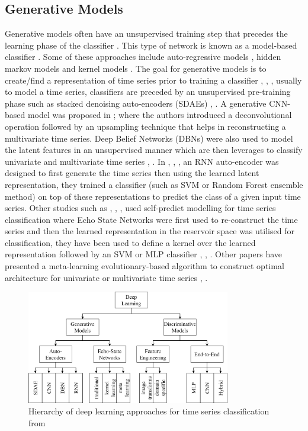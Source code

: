 \documentclass[journal]{IEEEtran}
\begin{document}
\subsection{Generative Models}
Generative models often have an unsupervised training step that precedes the learning phase of the classifier \cite{langkvist2014}. This type of network is known as a model-based classifier \cite{Bagnall2016b}. Some of these approaches include auto-regressive models \cite{bagnall2014}, hidden markov models \cite{kotsifakos2014} and kernel models \cite{chen2013}. The goal for generative models is to create/find a representation of time series prior to training a classifier \cite{IsmailFawaz2018deep}, \cite{langkvist2014}, , usually to model a time series, classifiers are preceded by an unsupervised pre-training phase such as stacked denoising auto-encoders (SDAEs) \cite{bengio2013}, \cite{hu2016}. A generative CNN-based model was proposed in \cite{wang2016}; \cite{mittelman2015} where the authors introduced a deconvolutional operation followed by an upsampling technique that helps in reconstructing a multivariate time series. Deep Belief Networks (DBNs) were also used to model the latent features in an unsupervised manner which are then leverages to classify univariate and multivariate time series \cite{wang2017a}, \cite{banerjee2017}. In \cite{mehdiyev2017}, \cite{malhotra2017}, \cite{rajan2018}, an RNN auto-encoder was designed to first generate the time series then using the learned latent representation, they trained a classifier (such as SVM or Random Forest ensemble method) on top of these representations to predict the class of a given input time series.
Other studies such as \cite{aswolinskiy2017}, \cite{bianchi2020}, \cite{chouikhi2018}, \cite{ma2016} used self-predict modelling for time series classification where Echo State Networks were first used to re-construct the time series and then the learned representation in the reservoir space was utilised for classification, they have been used to define a kernel over the learned representation followed by an SVM or MLP classifier \cite{chen2013}, \cite{chen2015}, \cite{che2017}. Other papers have presented a meta-learning evolutionary-based algorithm to construct optimal architecture for univariate or multivariate time series \cite{wang2016}, \cite{gong2019}. 

\begin{figure}[h]
    \centering
    \includegraphics[width=3.5in]{assets/DL_approaches.png}
    
    \caption{Hierarchy of deep learning approaches for time series classification from  \cite{IsmailFawaz2018deep}\cite{langkvist2014}}
    \label{fig:dl-groups}
\end{figure}
\end{document}

